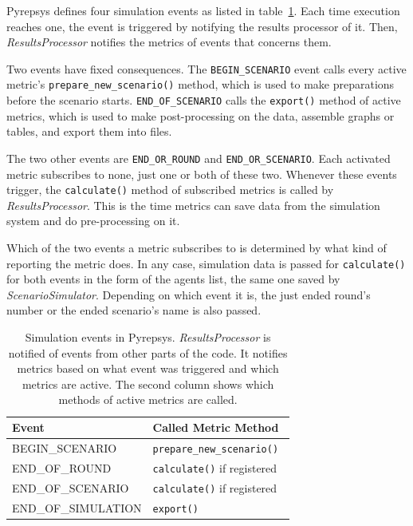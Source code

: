 \documentclass[%
    ]{\PathToTumTemplate/thesis/tum_thesis}
\begin{document}
Pyrepsys defines four simulation events as listed in table~\ref{tab:simulation_events}.
Each time execution reaches one, the event is triggered by notifying the results processor of it.
Then, \emph{ResultsProcessor} notifies the metrics of events that concerns them.

Two events have fixed consequences.
The \lstinline{BEGIN_SCENARIO} event calls every active metric's \lstinline{prepare_new_scenario()} method, which is used to make preparations before the scenario starts.
\lstinline{END_OF_SCENARIO} calls the \lstinline{export()} method of active metrics, which is used to make post-processing on the data, assemble graphs or tables, and export them into files.

The two other events are \lstinline{END_OR_ROUND} and \lstinline{END_OR_SCENARIO}.
Each activated metric subscribes to none, just one or both of these two.
Whenever these events trigger, the \lstinline{calculate()} method of subscribed metrics is called by \emph{ResultsProcessor}.
This is the time metrics can save data from the simulation system and do pre-processing on it.

Which of the two events a metric subscribes to is determined by what kind of reporting the metric does.
In any case, simulation data is passed for \lstinline{calculate()} for both events in the form of the agents list, the same one saved by \emph{ScenarioSimulator}.
Depending on which event it is, the just ended round's number or the ended scenario's name is also passed.

\begin{table}[tbp]
\centering
\begin{tabular}{ll}
\toprule
\textbf{Event}        & \textbf{Called Metric Method} \\ \midrule
BEGIN\_SCENARIO       & \texttt{prepare\_new\_scenario() } \\
END\_OF\_ROUND        & \texttt{calculate()} if registered \\
END\_OF\_SCENARIO     & \texttt{calculate()} if registered \\
END\_OF\_SIMULATION   &  \texttt{export()} \\
\bottomrule
\end{tabular}
\caption{
	Simulation events in Pyrepsys.
	\emph{ResultsProcessor} is notified of events from other parts of the code.
	It notifies metrics based on what event was triggered and which metrics are active.
	The second column shows which methods of active metrics are called.
}
\label{tab:simulation_events}
\end{table}
\end{document}
